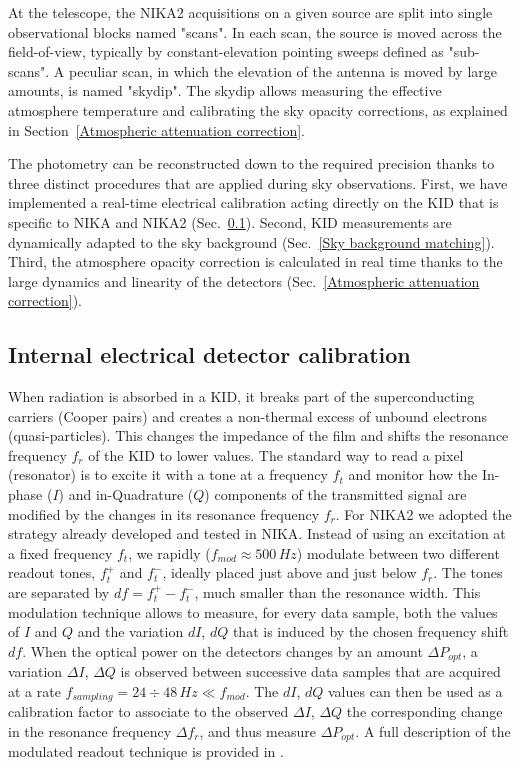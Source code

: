 \documentclass[]{aa} %
\begin{document}
At the telescope, the NIKA2 acquisitions on a given source are split into single observational blocks named "scans". In each scan, the source is moved across the field-of-view, typically by constant-elevation pointing sweeps defined as "sub-scans". A peculiar scan, in which the elevation of the antenna is moved by large amounts, is named "skydip". The skydip allows measuring the effective atmosphere temperature and calibrating the sky opacity corrections, as explained in Section~\ref{Atmospheric attenuation correction}.

The photometry can be reconstructed down to the required precision thanks to three distinct procedures that are applied during sky observations. First, we have implemented a real-time electrical calibration acting directly on the KID that is specific to NIKA and NIKA2 (Sec.~\ref{Internal detectors calibration}). Second, KID measurements are dynamically adapted to the sky background (Sec.~\ref{Sky background matching}). Third, the atmosphere opacity correction is calculated in real time thanks to the large dynamics and linearity of the detectors (Sec.~\ref{Atmospheric attenuation correction}).



\subsection{Internal electrical detector calibration}
\label{Internal detectors calibration}

When radiation is absorbed in a KID, it breaks part of the superconducting carriers (Cooper pairs) and creates a non-thermal excess of unbound electrons (quasi-particles). This changes the impedance of the film and shifts the resonance frequency $f_r$ of the KID to lower values.
The standard way to read a pixel (resonator) is to excite it with a tone at a frequency $f_t$ and monitor how the In-phase ($I$) and in-Quadrature ($Q$) components of the transmitted signal are modified by the changes in its resonance frequency $f_r$. For NIKA2 we adopted the strategy already developed and tested in NIKA. Instead of using an excitation at a fixed frequency $f_t$, we rapidly ($f_{mod} \approx 500\,Hz$) modulate between two different readout tones, $f_t^+$ and $f_t^-$, ideally placed just above and just below $f_r$. The tones are separated by $df=f_t^+-f_t^-$, much smaller than the resonance width. This modulation technique allows to measure, for every data sample, both the values of $I$ and $Q$ and the variation $dI$, $dQ$ that is induced by the chosen frequency shift $df$. When the optical power on the detectors changes by an amount $\Delta P_{opt}$, a variation $\Delta I$, $\Delta Q$ is observed between successive data samples that are acquired at a rate $f_{sampling} = 24\div48\,Hz \ll  f_{mod} $. The $dI$, $dQ$ values can then be used as a calibration factor to associate to the observed $\Delta I$, $\Delta Q$ the corresponding change in the resonance frequency $\Delta f_r$, and thus measure $\Delta P_{opt}$. A full description of the modulated readout technique is provided in \cite{Calvo2013}.
\end{document}
